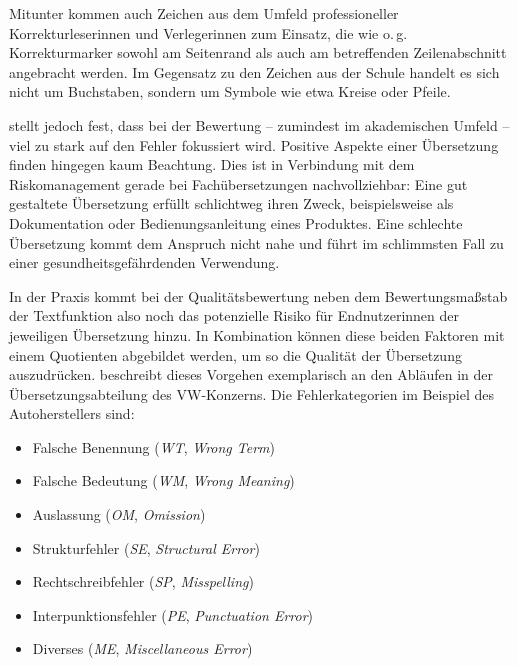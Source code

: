     
Mitunter kommen auch Zeichen aus dem Umfeld professioneller Korrekturleser{\textperiodcentered}innen und Verleger{\textperiodcentered}innen zum Einsatz, die wie o.\,g. Korrekturmarker sowohl am Seitenrand als auch am betreffenden Zeilenabschnitt angebracht werden. Im Gegensatz zu den Zeichen aus der Schule handelt es sich nicht um Buchstaben, sondern um Symbole wie etwa Kreise oder Pfeile. 

\citet[236]{martin_martin_sobre_2010} stellt jedoch fest, dass bei der Bewertung -- zumindest im akademischen Umfeld -- viel zu stark auf den Fehler fokussiert wird. Positive Aspekte einer Übersetzung finden hingegen kaum Beachtung. Dies ist in Verbindung mit dem Riskomanagement gerade bei Fachübersetzungen nachvollziehbar: Eine gut gestaltete Übersetzung erfüllt schlichtweg ihren Zweck, beispielsweise als Dokumentation oder Bedienungsanleitung eines Produktes. Eine schlechte Übersetzung kommt dem Anspruch nicht nahe und führt im schlimmsten Fall zu einer gesundheitsgefährdenden Verwendung.

In der Praxis kommt bei der Qualitätsbewertung neben dem Bewertungsmaßstab der Textfunktion also noch das potenzielle Risiko für Endnutzer{\textperiodcentered}innen der jeweiligen Übersetzung hinzu. In Kombination können diese beiden Faktoren mit einem Quotienten abgebildet werden, um so die Qualität der Übersetzung auszudrücken. \citet[24]{dalla-zuanna_direkte_2010} beschreibt dieses Vorgehen exemplarisch an den Abläufen in der Übersetzungsabteilung des VW-Konzerns. Die Fehlerkategorien im Beispiel des Autoherstellers sind:

\begin{itemize}

\item Falsche Benennung (\emph{WT}, \emph{Wrong Term})

\item Falsche Bedeutung (\emph{WM}, \emph{Wrong Meaning})

\item Auslassung (\emph{OM}, \emph{Omission})

\item Strukturfehler (\emph{SE}, \emph{Structural Error})

\item Rechtschreibfehler (\emph{SP}, \emph{Misspelling})

\item Interpunktionsfehler (\emph{PE}, \emph{Punctuation Error})

\item Diverses (\emph{ME}, \emph{Miscellaneous Error})

\end{itemize}

